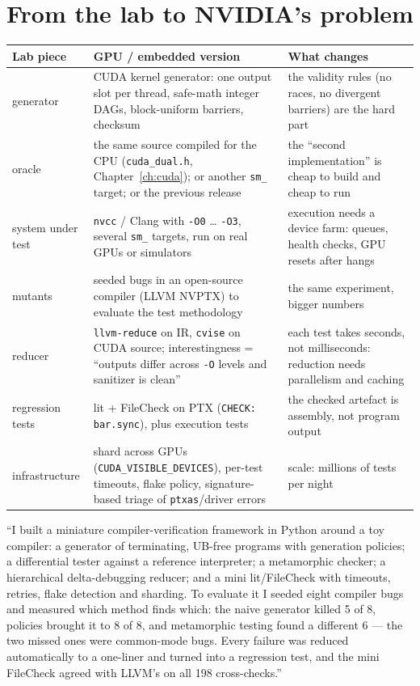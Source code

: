 \documentclass[10pt,a4paper,openany,oneside]{report}
\newcommand{\prio}[1]{\texorpdfstring{\ifcase#1\or{\color{gold}\ding{72}}\or{\color{gold}\ding{72}\ding{72}}\or{\color{gold}\ding{72}\ding{72}\ding{72}}\fi}{}}
\begin{document}
\section{From the lab to NVIDIA's problem \prio{3}}
\begin{center}\small
\begin{xltabular}{\textwidth}{@{}L{3.4cm}L{5.4cm}Y@{}}
\toprule
\textbf{Lab piece} & \textbf{GPU / embedded version} & \textbf{What changes}\\
\midrule\endhead
generator & CUDA kernel generator: one output slot per thread, safe-math integer DAGs, block-uniform barriers, checksum & the validity rules (no races, no divergent barriers) are the hard part\\
oracle & the same source compiled for the CPU (\texttt{cuda\_dual.h}, Chapter~\ref{ch:cuda}); or another \texttt{sm\_} target; or the previous release & the ``second implementation'' is cheap to build and cheap to run\\
system under test & \texttt{nvcc} / Clang with \texttt{-O0} \ldots{} \texttt{-O3}, several \texttt{sm\_} targets, run on real GPUs or simulators & execution needs a device farm: queues, health checks, GPU resets after hangs\\
mutants & seeded bugs in an open-source compiler (LLVM NVPTX) to evaluate the test methodology & the same experiment, bigger numbers\\
reducer & \texttt{llvm-reduce} on IR, \texttt{cvise} on CUDA source; interestingness = ``outputs differ across \texttt{-O} levels and sanitizer is clean'' & each test takes seconds, not milliseconds: reduction needs parallelism and caching\\
regression tests & lit + FileCheck on PTX (\texttt{CHECK: bar.sync}), plus execution tests & the checked artefact is assembly, not program output\\
infrastructure & shard across GPUs (\texttt{CUDA\_VISIBLE\_DEVICES}), per-test timeouts, flake policy, signature-based triage of \texttt{ptxas}/driver errors & scale: millions of tests per night\\
\bottomrule
\end{xltabular}
\end{center}
\begin{tipbox}
``I built a miniature compiler-verification framework in Python around a toy compiler: a generator of terminating, UB-free programs with generation policies; a differential tester against a reference interpreter; a metamorphic checker; a hierarchical delta-debugging reducer; and a mini lit/FileCheck with timeouts, retries, flake detection and sharding. To evaluate it I seeded eight compiler bugs and measured which method finds which: the naive generator killed 5 of 8, policies brought it to 8 of 8, and metamorphic testing found a different 6 --- the two missed ones were common-mode bugs. Every failure was reduced automatically to a one-liner and turned into a regression test, and the mini FileCheck agreed with LLVM's on all 198 cross-checks.''
\end{tipbox}
\end{document}

